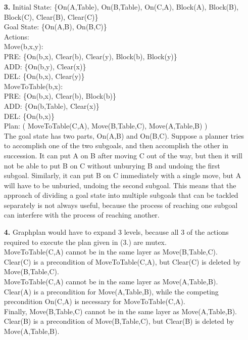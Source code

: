 \documentclass{article}
\begin{document}
\begin{enumerate}
\item[\textbf{3.}]
Initial State: \{On(A,Table), On(B,Table), On(C,A), Block(A), Block(B), Block(C), Clear(B), Clear(C)\}\\
Goal State: \{On(A,B), On(B,C)\}\\
\vspace{6pt}
Actions:\\
\vspace{2pt}
Move(b,x,y):\\
PRE: \{On(b,x), Clear(b), Clear(y), Block(b), Block(y)\}\\
ADD: \{On(b,y), Clear(x)\}\\
DEL: \{On(b,x), Clear(y)\}\\
\vspace{2pt}
MoveToTable(b,x):\\
PRE: \{On(b,x), Clear(b), Block(b)\}\\
ADD: \{On(b,Table), Clear(x)\}\\
DEL: \{On(b,x)\}\\
\vspace{6pt}
Plan: ( MoveToTable(C,A), Move(B,Table,C), Move(A,Table,B) )\\
\vspace{6pt}
The goal state has two parts, On(A,B) and On(B,C). Suppose a planner tries to
accomplish one of the two subgoals, and then accomplish the other in 
succession. It can put A on B after moving C out of the way, but then it will
not be able to put B on C without unburying B and undoing the first subgoal.
Similarly, it can put B on C immediately with a single move, but A will have
to be unburied, undoing the second subgoal. This means that the approach of
dividing a goal state into multiple subgoals that can be tackled separately is
not always useful, because the process of reaching one subgoal can interfere
with the process of reaching another.

\item[\textbf{4.}]
Graphplan would have to expand 3 levels, because all 3 of the actions required to execute the plan given in (3.) are mutex.\\
\vspace{6pt}
MoveToTable(C,A) cannot be in the same layer as Move(B,Table,C). Clear(C) is a precondition of MoveToTable(C,A), but Clear(C) is deleted by Move(B,Table,C).\\
\vspace{6pt}
MoveToTable(C,A) cannot be in the same layer as Move(A,Table,B). Clear(A) is a precondition for Move(A,Table,B), while the competing precondition On(C,A) is necessary for MoveToTable(C,A).\\
\vspace{6pt}
Finally, Move(B,Table,C) cannot be in the same layer as Move(A,Table,B). Clear(B) is a precondition of Move(B,Table,C), but Clear(B) is deleted by Move(A,Table,B). 


\end{enumerate}
\end{document}
